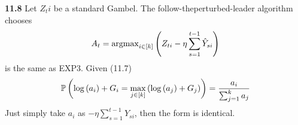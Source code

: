 \noindent\textbf{11.8} Let $Z_ti$ be a standard Gambel. The follow-theperturbed-leader algorithm chooses
\begin{equation}
    A_{t}=\operatorname{argmax}_{i \in[k]}\left(Z_{t i}-\eta \sum_{s=1}^{t-1} \hat{Y}_{s i}\right)\notag
\end{equation}
is the same as EXP3. Given (11.7)
\begin{equation}
    \mathbb{P}\left(\log \left(a_{i}\right)+G_{i}=\max _{j \in[k]}\left(\log \left(a_{j}\right)+G_{j}\right)\right)=\frac{a_{i}}{\sum_{j=1}^{k} a_{j}}\notag
\end{equation}
Just simply take $a_i$ as $-\eta \sum_{s=1}^{t-1} \hat{Y}_{s i}$, then the form is identical.